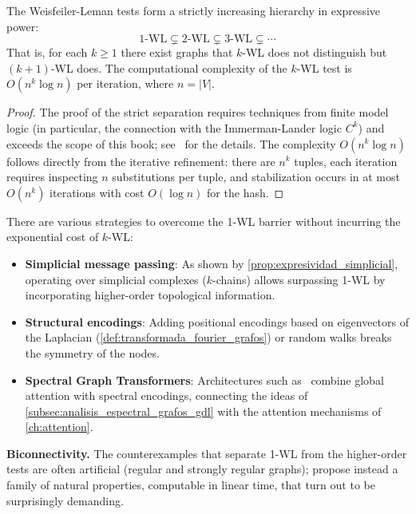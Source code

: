 \begin{proposition}\label{prop:jerarquia_kwl}
	The Weisfeiler-Leman tests form a strictly increasing hierarchy in expressive power:
	\[
		1\text{-WL} \subsetneq 2\text{-WL} \subsetneq 3\text{-WL} \subsetneq \cdots
	\]
	That is, for each $k \geq 1$ there exist graphs that $k$-WL does not distinguish but $(k+1)$-WL does. The computational complexity of the $k$-WL test is $O(n^k \log n)$ per iteration, where $n = |V|$.
\end{proposition}

\begin{proof}
	The proof of the strict separation requires techniques from finite model logic (in particular, the connection with the Immerman-Lander logic $C^k$) and exceeds the scope of this book; see~\citet{morris2019weisfeiler} for the details. The complexity $O(n^k \log n)$ follows directly from the iterative refinement: there are $n^k$ tuples, each iteration requires inspecting $n$ substitutions per tuple, and stabilization occurs in at most $O(n^k)$ iterations with cost $O(\log n)$ for the hash.
\end{proof}

There are various strategies to overcome the 1-WL barrier without incurring the exponential cost of $k$-WL:
\begin{itemize}
	\item \textbf{Simplicial message passing}: As shown by \autoref{prop:expresividad_simplicial}, operating over simplicial complexes ($k$-chains) allows surpassing 1-WL by incorporating higher-order topological information.
	\item \textbf{Structural encodings}: Adding positional encodings based on eigenvectors of the Laplacian (\autoref{def:transformada_fourier_grafos}) or random walks breaks the symmetry of the nodes.
	\item \textbf{Spectral Graph Transformers}: Architectures such as~\citet{kreuzer2021spectral} combine global attention with spectral encodings, connecting the ideas of \autoref{subsec:analisis_espectral_grafos_gdl} with the attention mechanisms of \autoref{ch:attention}.
\end{itemize}

\textbf{Biconnectivity.} The counterexamples that separate 1-WL from the higher-order tests are often artificial (regular and strongly regular graphs); \citet{zhang2023biconnectivity} propose instead a family of natural properties, computable in linear time, that turn out to be surprisingly demanding.

